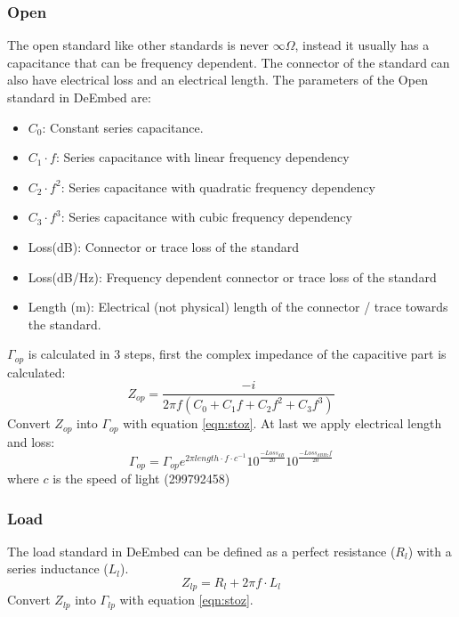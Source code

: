\subsubsection{Open}
The open standard like other standards is never $\infty\Omega$, instead it usually has a capacitance that can be frequency dependent. The connector of the standard can also have electrical loss and an electrical length. The parameters of the Open standard in DeEmbed are:
\begin{itemize}
	\item $C_0$: Constant series capacitance.
	\item $C_1 \cdot f$: Series capacitance with linear frequency dependency
	\item $C_2 \cdot f^2$: Series capacitance with quadratic frequency dependency
	\item $C_3 \cdot f^3$: Series capacitance with cubic frequency dependency
	\item Loss(dB): Connector or trace loss of the standard
	\item Loss(dB/Hz): Frequency dependent connector or trace loss of the standard
	\item Length (m): Electrical (not physical) length of the connector / trace towards the standard.
\end{itemize}
$\Gamma_{op}$ is calculated in 3 steps, first the complex impedance of the capacitive part is calculated:
\begin{equation}
Z_{op} = \frac{-i}{2 \pi f (C_0 + C_1 f + C_2 f^2 + C_3 f^3)}
\end{equation}
Convert $Z_{op}$ into $\Gamma_{op}$ with equation \ref{eqn:stoz}. 
At last we apply electrical length and loss:
\begin{equation}
\Gamma_{op} = \Gamma_{op} e^{2 \pi length\cdot f\cdot c^{-1}} 10^{\frac{-Loss_{dB}}{20}} 10^{\frac{-Loss_{dBHz} f }{20}}
\end{equation}
where $c$ is the speed of light (299792458)
\subsubsection{Load}
The load standard in DeEmbed can be defined as a perfect resistance ($R_l$) with a series inductance ($L_l$).
\begin{equation}
Z_{lp} = R_l + 2 \pi f \cdot L_l
\end{equation}
Convert $Z_{lp}$ into $\Gamma_{lp}$ with equation \ref{eqn:stoz}.
